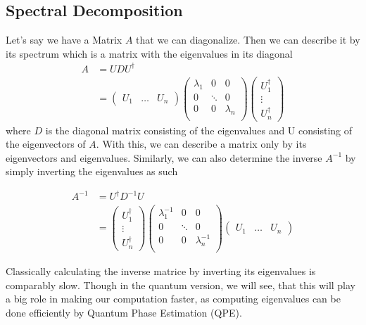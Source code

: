 \subsection{Spectral Decomposition}
Let's say we have a Matrix $A$ that we can diagonalize. 
Then we can describe it by its spectrum which is a matrix with the eigenvalues in its diagonal
\begin{equation} 
\begin{split}
A &=  U D U^{\dagger} \\
&= \begin{pmatrix} U_1 & \dots & U_n \end{pmatrix} \begin{pmatrix} \lambda_1 & 0 & 0 \\  0 & \ddots & 0\\ 0 & 0& \lambda_n \\ \end{pmatrix} \begin{pmatrix} U^\dagger_1 \\ \vdots \\ U^\dagger_n \end{pmatrix}
\end{split}
\end{equation}
where $D$ is the diagonal matrix consisting of the eigenvalues and U consisting of the eigenvectors of $A$.
With this, we can describe a matrix only by its eigenvectors and eigenvalues. 
Similarly, we can also determine the inverse $A^{-1}$ by simply inverting the eigenvalues as such

\begin{equation}
\begin{split}
 A^{-1} 
 &=  U^{\dagger} D^{-1} U\\
 &= \begin{pmatrix} U^\dagger_1 \\ \vdots \\ U^\dagger_n \end{pmatrix}
\begin{pmatrix} \lambda_1^{-1} & 0 & 0\\ 0 & \ddots & 0\\ 0 & 0& \lambda_n^{-1} \\ \end{pmatrix}
\begin{pmatrix} U_1 & \dots & U_n \end{pmatrix} 
\end{split}
\end{equation}


Classically calculating the inverse matrice by inverting its eigenvalues is comparably slow. 
Though in the quantum version, we will see, that this will play a big role in making our computation faster, as computing eigenvalues can be done efficiently by Quantum Phase Estimation (QPE).

